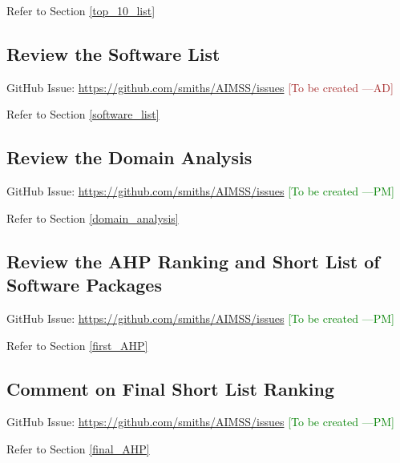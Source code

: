 \documentclass[12pt]{article}
\newcommand{\authornote}[3]{\textcolor{#1}{[#3 ---#2]}}
\newcommand{\authornote}[3]{}
\newcommand{\pmi}[1]{\authornote{green}{PM}{#1}} %
\newcommand{\ad}[1]{\authornote{brown}{AD}{#1}} %
\begin{document}
\noindent Refer to Section \ref{top_10_list}

\subsection{Review the Software List}
\label{task_software_list}
GitHub Issue:
\href{https://github.com/smiths/AIMSS/issues}{https://github.com/smiths/AIMSS/issues}
\ad{To be created}

\noindent Refer to Section \ref{software_list}

\subsection{Review the Domain Analysis}
GitHub Issue:
\href{https://github.com/smiths/AIMSS/issues}{https://github.com/smiths/AIMSS/issues}
\pmi{To be created}

\noindent Refer to Section \ref{domain_analysis}

\subsection{Review the AHP Ranking and Short List of Software Packages}
GitHub Issue:
\href{https://github.com/smiths/AIMSS/issues}{https://github.com/smiths/AIMSS/issues}
\pmi{To be created}

\noindent Refer to Section \ref{first_AHP}

\subsection{Comment on Final Short List Ranking}
\label{task_final_ranking}
GitHub Issue:
\href{https://github.com/smiths/AIMSS/issues}{https://github.com/smiths/AIMSS/issues}
\pmi{To be created}

\noindent Refer to Section \ref{final_AHP}

%
%
%
\end{document}
